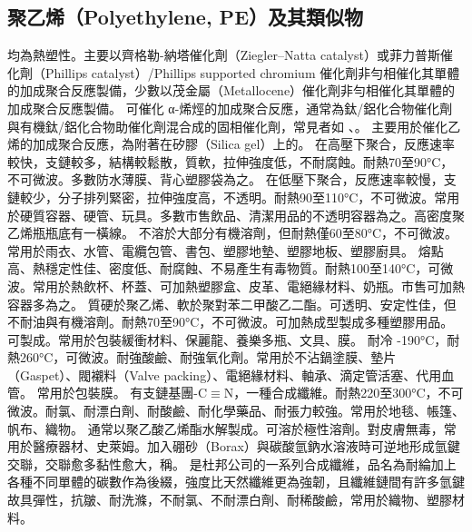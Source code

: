 \documentclass[a4paper,12pt]{report}
\begin{document}
\begin{itemize}
\begin{itemize}
\subsection{聚乙烯（Polyethylene, PE）及其類似物}
均為熱塑性。主要以齊格勒-納塔催化劑（Ziegler–Natta catalyst）或菲力普斯催化劑（Phillips catalyst）/Phillips supported chromium 催化劑非勻相催化其單體的加成聚合反應製備，少數以茂金屬（Metallocene）催化劑非勻相催化其單體的加成聚合反應製備。
可催化 α-烯烴的加成聚合反應，通常為鈦/鋁化合物催化劑與有機鈦/鋁化合物助催化劑混合成的固相催化劑，常見者如 、。
主要用於催化乙烯的加成聚合反應，為附著在矽膠（Silica gel）上的。
在高壓下聚合，反應速率較快，支鏈較多，結構較鬆散，質軟，拉伸強度低，不耐腐蝕。耐熱70至90°C，不可微波。多數防水薄膜、背心塑膠袋為之。
在低壓下聚合，反應速率較慢，支鏈較少，分子排列緊密，拉伸強度高，不透明。耐熱90至110°C，不可微波。常用於硬質容器、硬管、玩具。多數市售飲品、清潔用品的不透明容器為之。高密度聚乙烯瓶瓶底有一橫線。
不溶於大部分有機溶劑，但耐熱僅60至80°C，不可微波。常用於雨衣、水管、電纜包管、書包、塑膠地墊、塑膠地板、塑膠廚具。
熔點高、熱穩定性佳、密度低、耐腐蝕、不易產生有毒物質。耐熱100至140°C，可微波。常用於熱飲杯、杯蓋、可加熱塑膠盒、皮革、電絕緣材料、奶瓶。市售可加熱容器多為之。
質硬於聚乙烯、軟於聚對苯二甲酸乙二酯。可透明、安定性佳，但不耐油與有機溶劑。耐熱70至90°C，不可微波。可加熱成型製成多種塑膠用品。可製成。常用於包裝緩衝材料、保麗龍、養樂多瓶、文具、膜。
耐冷 -190°C，耐熱260°C，可微波。耐強酸鹼、耐強氧化劑。常用於不沾鍋塗膜、墊片（Gaspet）、閥襯料（Valve packing）、電絕緣材料、軸承、滴定管活塞、代用血管。
常用於包裝膜。
有支鏈基團-C$\equiv$N，一種合成纖維。耐熱220至300°C，不可微波。耐氯、耐漂白劑、耐酸鹼、耐化學藥品、耐張力較強。常用於地毯、帳篷、帆布、織物。
通常以聚乙酸乙烯酯水解製成。可溶於極性溶劑。對皮膚無毒，常用於醫療器材、史萊姆。加入硼砂（Borax）與碳酸氫鈉水溶液時可逆地形成氫鍵交聯，交聯愈多黏性愈大，稱。
是杜邦公司的一系列合成纖維，品名為耐綸加上各種不同單體的碳數作為後綴，強度比天然纖維更為強韌，且纖維鏈間有許多氫鍵故具彈性，抗皺、耐洗滌，不耐氯、不耐漂白劑、耐稀酸鹼，常用於織物、塑膠材料。


\end{itemize}
\end{itemize}
\end{document}
